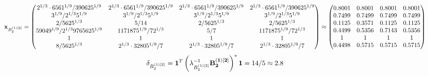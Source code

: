 \documentclass[10pt,a4paper]{article}
\begin{document}
	\[
		\bold{x}_{B_2^{(1)[2]}} = 
		\begin{pmatrix}
			{{2^ {1 / 3}} \cdot {6561^ {1 / 9}}} / {{390625^ {1 / 9}}} & {{2^ {1 / 3}} \cdot {6561^ {1 / 9}}} / {{390625^ {1 / 9}}} & {{2^ {1 / 3}} \cdot {6561^ {1 / 9}}} / {{390625^ {1 / 9}}} & {{2^ {1 / 3}} \cdot {6561^ {1 / 9}}} / {{390625^ {1 / 9}}} \\
			{{3^ {1 / 9}}} / {{2^ {1 / 3}}{5^ {1 / 9}}} & {{3^ {1 / 9}}} / {{2^ {1 / 3}}{5^ {1 / 9}}} & {{3^ {1 / 9}}} / {{2^ {1 / 3}}{5^ {1 / 9}}} & {{3^ {1 / 9}}} / {{2^ {1 / 3}}{5^ {1 / 9}}} \\
			{{2}} / {{5625^ {1 / 3}}} & {{5}} / {{14}} & {{2}} / {{5625^ {1 / 3}}} & {{2}} / {{5625^ {1 / 3}}} \\
			{{59049^ {1 / 9}}} / {{2^ {1 / 3}}{9765625^ {1 / 9}}} & {{1171875^ {1 / 9}}} / {{7}{2^ {1 / 3}}} & {{5}} / {{7}} & {{1171875^ {1 / 9}}} / {{7}{2^ {1 / 3}}} \\
			{1}{} & {1}{} & {1}{} & {1}{} \\
			{{8}} / {{5625^ {1 / 3}}} & {{2^ {1 / 3}} \cdot {32805^ {1 / 9}}} / {{7}} & {{2^ {1 / 3}} \cdot {32805^ {1 / 9}}} / {{7}} & {{2^ {1 / 3}} \cdot {32805^ {1 / 9}}} / {{7}} \\
		\end{pmatrix}
		\approx
		\begin{pmatrix}
			0.8001   & 0.8001   & 0.8001   & 0.8001   \\
			0.7499   & 0.7499   & 0.7499   & 0.7499   \\
			0.1125   & 0.3571   & 0.1125   & 0.1125   \\
			0.4499   & 0.5356   & 0.7143   & 0.5356   \\
			1        & 1        & 1        & 1        \\
			0.4498   & 0.5715   & 0.5715   & 0.5715   \\
		\end{pmatrix}
	\]
	\[
		\delta_{B_2^{(1)[2]}} = \bold{1}^T \left(\lambda_{B_2^{(1)[2]}}^{-1}\bold{B_2^{(1)[2]}}\right)^* \bold{1} = {{14}} / {{5}}\approx 2.8
	\]
\end{document}
